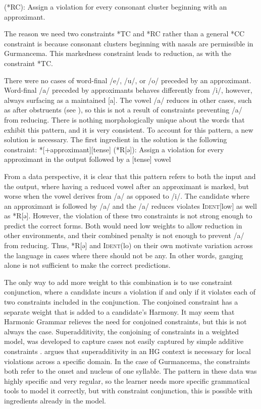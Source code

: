 \documentclass[output=paper,newtxmath,modfonts,nonflat,draftmode]{langsci/langscibook}
\begin{document}
\ea	*[+approximant][+consonantal] (*RC): Assign a violation for every consonant 
	cluster beginning with an approximant. 
\z

The reason we need two constraints *TC and *RC rather than a general *CC constraint is because consonant clusters beginning with nasals are permissible in Gurmancema. This markedness constraint leads to reduction, as with the constraint *TC. 


There were no cases of word-final /e/, /u/, or /o/ preceded by an approximant. Word-final /a/ preceded by approximants behaves differently from /i/, 
however, always surfacing as a maintained [a]. The vowel /a/ reduces in other cases, such as after obstruents (see ), so this is not a result of constraints preventing /a/ from reducing. There is nothing morphologically unique about the words that exhibit this pattern, and it is very consistent. To account for this pattern, a new solution is necessary. The first ingredient in the solution is the following constraint: 
\ea
*[+approximant][\textminus tense] (*R[ə]): Assign a violation for every approximant in 	the output followed by a [\textminus tense] vowel
\z

From a data perspective, it is clear that this pattern refers to both the input and the output, where having a reduced vowel after an approximant is marked, but worse when the vowel derives from /a/ as opposed to /i/. The candidate where an approximant is followed by /a/ and the /a/ reduces violates \textsc{Ident}[low] as well as *R[ə]. However, the violation of these two constraints is not strong enough to predict the correct forms. Both would need low weights to allow reduction in other environments, and their combined penalty is not enough to prevent /a/ from reducing. Thus, *R[ə] and \textsc{Ident}(lo) on their own motivate variation across the language in cases where there should not be any. In other words, ganging alone is not sufficient to make the correct predictions. 
	
The only way to add more weight to this combination is to use constraint conjunction, where a candidate incurs a violation if and only if it violates each of two constraints included in the conjunction. The conjoined constraint has a separate weight that is added to a candidate’s Harmony. It may seem that Harmonic Grammar relieves the need for conjoined constraints, but this is not always the case. Superadditivity, the conjoining of constraints in a weighted model, was developed to capture cases not easily captured by simple additive constraints \citep{AlbrightEtAl2008,GreenDavis2014}. \citet{Smolensky2006} argues that superadditivity in an HG context is necessary for local violations across a specific domain. In the case of Gurmancema, the constraints both refer to the onset and nucleus of one syllable. The pattern in these data was highly specific and very regular, so the learner needs more specific grammatical tools to model it correctly, but with constraint conjunction, this is possible with ingredients already in the model. 
\end{document}
